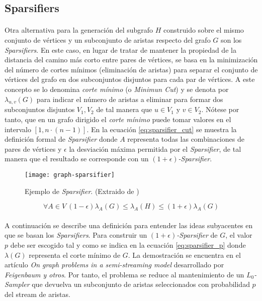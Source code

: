\documentclass{subfiles}
\begin{document}
      \subsection{Sparsifiers}
      \label{sec:sparsifiers}

        \paragraph{}
        Otra alternativa para la generación del subgrafo $H$ construido sobre el mismo conjunto de vértices y un subconjunto de aristas respecto del grafo $G$ son los \emph{Sparsifiers}. En este caso, en lugar de tratar de mantener la propiedad de la distancia del camino más corto entre pares de vértices, se basa en la minimización del número de cortes mínimos (eliminación de aristas) para separar el conjunto de vértices del grafo en dos subconjuntos disjuntos para cada par de vértices. A este concepto se lo denomina \emph{corte mínimo} (o \emph{Minimun Cut}) y se denota por $\lambda_{u,v}(G)$ para indicar el número de aristas a eliminar para formar dos subconjuntos disjuntos $V_{1}, V_{2}$ de tal manera que $u\in V_{1}$ y $v \in V_{2}$. Nótese por tanto, que en un grafo dirigido el \emph{corte mínimo} puede tomar valores en el intervalo $[1, n\cdot(n-1)]$.  En la ecuación \eqref{eq:sparsifier_cut} se muestra la definición formal de \emph{Sparsifier} donde $A$ representa todas las combinaciones de pares de vértices y $\epsilon$ la desviación máxima permitida por el \emph{Sparsifier}, de tal manera que el resultado se corresponde con un \emph{$(1 +\epsilon)$-Sparsifier}.

        \begin{figure}
          \centering
          \texttt{[image: graph-sparsifier]}
          \caption{Ejemplo de \emph{Sparsifier}. (Extraido de \cite{harvey2011randomized})}
          \label{img:graph_community_structure}
        \end{figure}

        \begin{equation}
        \label{eq:sparsifier_cut}
          \forall A \in V \  (1-\epsilon)\lambda_A(G)\leq\lambda_A(H)\leq(1+\epsilon)\lambda_A(G)
        \end{equation}

        \paragraph{}
        A continuación se describe una definición para entender las ideas subyacentes en que se basan los \emph{Sparsifiers}. Para construir un \emph{$(1 +\epsilon)$-Sparsifier} de $G$, el valor $p$ debe ser escogido tal y como se indica en la ecuación \eqref{eq:sparsifier_p} donde $\lambda(G)$ representa el corte mínimo de $G$. La demostración se encuentra en el artículo \emph{On graph problems in a semi-streaming model} \cite{feigenbaum2005graph} desarrollado por \emph{Feigenbaum y otros}. Por tanto, el problema se reduce al mantenimiento de un \emph{$L_{0}$-Sampler} que devuelva un subconjunto de aristas seleccionados con probabilidad $p$ del stream de aristas.
\end{document}
